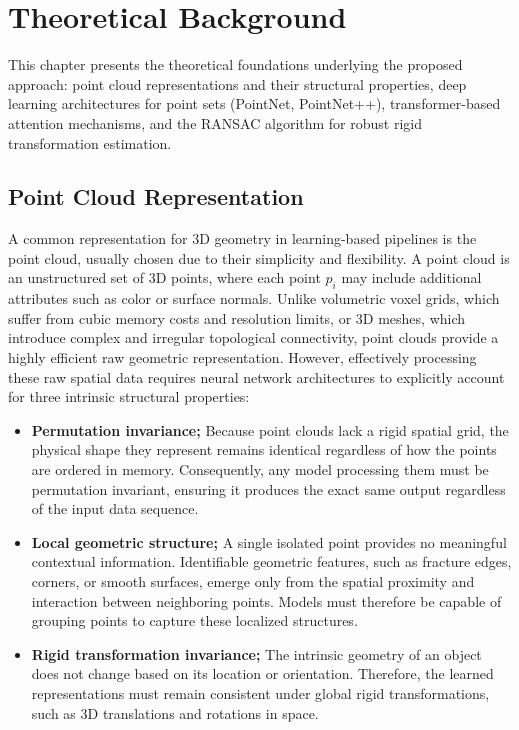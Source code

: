 \chapter{Theoretical Background}
\label{chap:ch3}

This chapter presents the theoretical foundations underlying the proposed approach: point cloud representations and their structural properties, deep learning architectures for point sets (PointNet, PointNet++), transformer-based attention mechanisms, and the RANSAC algorithm for robust rigid transformation estimation.

\section{Point Cloud Representation}

A common representation for 3D geometry in learning-based pipelines is the point cloud, usually chosen due to their simplicity and flexibility. A point cloud is an unstructured set of 3D points, where each point \(p_i\) may include additional attributes such as color or surface normals. Unlike volumetric voxel grids, which suffer from cubic memory costs and resolution limits, or 3D meshes, which introduce complex and irregular topological connectivity, point clouds provide a highly efficient raw geometric representation. However, effectively processing these raw spatial data requires neural network architectures to explicitly account for three intrinsic structural properties:
\begin{itemize}
    \item \textbf{Permutation invariance;} Because point clouds lack a rigid spatial grid, the physical shape they represent remains identical regardless of how the points are ordered in memory. Consequently, any model processing them must be permutation invariant, ensuring it produces the exact same output regardless of the input data sequence.
    \item \textbf{Local geometric structure;} A single isolated point provides no meaningful contextual information. Identifiable geometric features, such as fracture edges, corners, or smooth surfaces, emerge only from the spatial proximity and interaction between neighboring points. Models must therefore be capable of grouping points to capture these localized structures.
    \item \textbf{Rigid transformation invariance;} The intrinsic geometry of an object does not change based on its location or orientation. Therefore, the learned representations must remain consistent under global rigid transformations, such as 3D translations and rotations in space.
\end{itemize}

